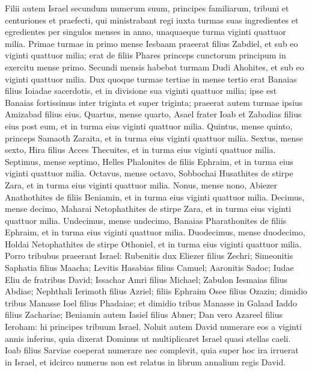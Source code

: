 \begin{biblechapter}  
\verse Filii autem Israel secundum numerum suum, principes familiarum, tribuni et centuriones et praefecti, qui ministrabant regi iuxta turmas suas ingredientes et egredientes per singulos menses in anno, unaquaeque turma viginti quattuor milia. 
\verse Primae turmae in primo mense Iesbaam praeerat filius Zabdiel, et sub eo viginti quattuor milia; 
\verse erat de filiis Phares princeps cunctorum principum in exercitu mense primo. 
\verse Secundi mensis habebat turmam Dudi Ahohites, et sub eo viginti quattuor milia. 
\verse Dux quoque turmae tertiae in mense tertio erat Banaias filius Ioiadae sacerdotis, et in divisione sua viginti quattuor milia; 
\verse ipse est Banaias fortissimus inter triginta et super triginta; praeerat autem turmae ipsius Amizabad filius eius.  
\verse Quartus, mense quarto, Asael frater Ioab et Zabadias filius eius post eum, et in turma eius viginti quattuor milia. 
\verse Quintus, mense quinto, princeps Samaoth Zaraita, et in turma eius viginti quattuor milia. 
\verse Sextus, mense sexto, Hira filius Acces Thecuites, et in turma eius viginti quattuor milia.  
\verse Septimus, mense septimo, Helles Phalonites de filiis Ephraim, et in turma eius viginti quattuor milia. 
\verse Octavus, mense octavo, Sobbochai Husathites de stirpe Zara, et in turma eius viginti quattuor milia. 
\verse Nonus, mense nono, Abiezer Anathothites de filiis Beniamin, et in turma eius viginti quattuor milia. 
\verse Decimus, mense decimo, Maharai Netophathites de stirpe Zara, et in turma eius viginti quattuor milia. 
\verse Undecimus, mense undecimo, Banaias Pharathonites de filiis Ephraim, et in turma eius viginti quattuor milia. 
\verse Duodecimus, mense duodecimo, Holdai Netophathites de stirpe Othoniel, et in turma eius viginti quattuor milia. 
\verse Porro tribubus praeerant Israel: Rubenitis dux Eliezer filius Zechri; Simeonitis Saphatia filius Maacha; 
\verse Levitis Hasabias filius Camuel; Aaronitis Sadoc; 
\verse Iudae Eliu de fratribus David; Issachar Amri filius Michael;  
\verse Zabulon Iesmaias filius Abdiae; Nephthali Ierimoth filius Azriel; 
\verse filiis Ephraim Osee filius Ozaziu; dimidio tribus Manasse Ioel filius Phadaiae;  
\verse et dimidio tribus Manasse in Galaad Iaddo filius Zachariae; Beniamin autem Iasiel filius Abner; 
\verse Dan vero Azareel filius Ieroham: hi principes tribuum Israel. 
\verse Noluit autem David numerare eos a viginti annis inferius, quia dixerat Dominus ut multiplicaret Israel quasi stellas caeli. 
\verse Ioab filius Sarviae coeperat numerare nec complevit, quia super hoc ira irruerat in Israel, et idcirco numerus non est relatus in librum annalium regis David. 

\end{biblechapter}
